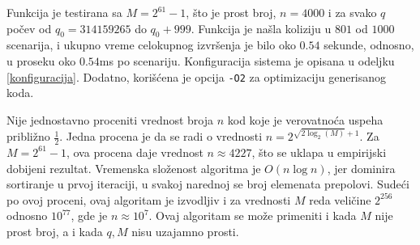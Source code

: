 \noindent
\begin{minipage}[l]{\textwidth}

\end{minipage}

Funkcija je testirana sa $M = 2^{61}-1$, \v sto je prost broj, $n = 4000$ i za svako $q$ po\v cev od $q_0 = 314159265$ do $q_0+999$. Funkcija je na\v sla koliziju u $801$ od $1000$ scenarija, i ukupno vreme celokupnog izvr\v senja je bilo oko $0.54$ sekunde, odnosno, u proseku oko $0.54$ms po scenariju. Konfiguracija sistema je opisana u odeljku \ref{konfiguracija}. Dodatno, kori\v s\' cena je opcija \texttt{-O2} za optimizaciju generisanog koda.

Nije jednostavno proceniti vrednost broja $n$ kod koje je verovatno\' ca uspeha pribli\v zno $\frac12$. Jedna procena\cite{cfantihash} je da se radi o vrednosti $n = 2^{\sqrt{2\log_2(M)}+1}$. Za $M = 2^{61}-1$, ova procena daje vrednost $n \approx 4227$, \v sto se uklapa u empirijski dobijeni rezultat. Vremenska slo\v zenost algoritma je $O(n \log n)$, jer dominira sortiranje u prvoj iteraciji, u svakoj narednoj se broj elemenata prepolovi. Sude\' ci po ovoj proceni, ovaj algoritam je izvodljiv i za vrednosti $M$ reda veli\v cine $2^{256}$ odnosno $10^{77}$, gde je $n \approx 10^7$. Ovaj algoritam se mo\v ze primeniti i kada $M$ nije prost broj, a i kada $q,M$ nisu uzajamno prosti.


